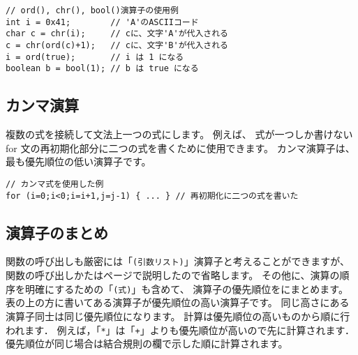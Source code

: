 \begin{mylist}
\begin{verbatim}
// ord(), chr(), bool()演算子の使用例
int i = 0x41;        // 'A'のASCIIコード
char c = chr(i);     // cに、文字'A'が代入される
c = chr(ord(c)+1);   // cに、文字'B'が代入される
i = ord(true);       // i は 1 になる
boolean b = bool(1); // b は true になる
\end{verbatim}
\end{mylist}

\subsection{カンマ演算}
複数の式を接続して文法上一つの式にします。
例えば、
式が一つしか書けない for 文の再初期化部分に二つの式を書くために使用できます。
カンマ演算子は、最も優先順位の低い演算子です。

\begin{mylist}
\begin{verbatim}
// カンマ式を使用した例
for (i=0;i<0;i=i+1,j=j-1) { ... } // 再初期化に二つの式を書いた
\end{verbatim}
\end{mylist}

\subsection{演算子のまとめ}

関数の呼び出しも厳密には「\verb/(引数リスト)/」演算子と考えることができますが、
関数の呼び出しかたは\pageref{chap3:func}ページで説明したので省略します。
その他に、演算の順序を明確にするための「\verb/(式)/」も含めて、
演算子の優先順位をにまとめます。
表の上の方に書いてある演算子が優先順位の高い演算子です。
同じ高さにある演算子同士は同じ優先順位になります。
計算は優先順位の高いものから順に行われます．
例えば，「\verb/*/」は「\verb/+/」よりも優先順位が高いので先に計算されます．
優先順位が同じ場合は結合規則の欄で示した順に計算されます。

